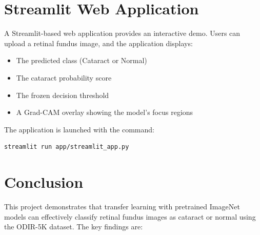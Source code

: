 \documentclass[12pt, a4paper]{article}
\begin{document}
\section{Streamlit Web Application}

A Streamlit-based web application provides an interactive demo. Users can upload a retinal fundus image, and the application displays:
\begin{itemize}
    \item The predicted class (Cataract or Normal)
    \item The cataract probability score
    \item The frozen decision threshold
    \item A Grad-CAM overlay showing the model's focus regions
\end{itemize}

The application is launched with the command:
\begin{lstlisting}
streamlit run app/streamlit_app.py
\end{lstlisting}



\section{Conclusion}

This project demonstrates that transfer learning with pretrained ImageNet models can effectively classify retinal fundus images as cataract or normal using the ODIR-5K dataset. The key findings are:
\end{document}
